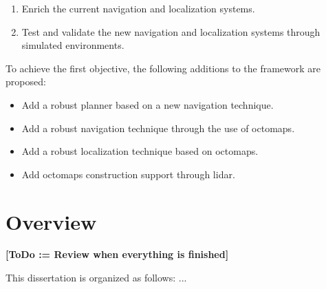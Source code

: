     \begin{enumerate}
      \item Enrich the current navigation and localization systems.
      \item Test and validate the new navigation and localization systems through simulated environments.
    \end{enumerate}

    To achieve the first objective, the following additions to the framework are proposed:

    \begin{itemize}
      \item Add a robust planner based on a new navigation technique.
      \item Add a robust navigation technique through the use of octomaps.
      \item Add a robust localization technique based on octomaps.
      \item Add octomaps construction support through lidar.
    \end{itemize}

  \section{Overview}

    \textbf{[ToDo := Review when everything is finished]}

    This dissertation is organized as follows: ...

